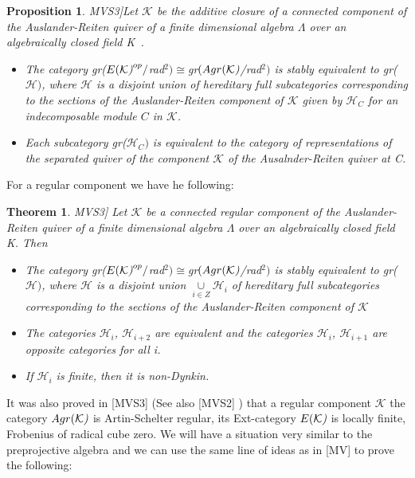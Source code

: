 \documentclass{amsart}
\newtheorem{theorem}{Theorem}
\theoremstyle{plain}
\newtheorem{proposition}{Proposition}
\numberwithin{equation}{section}
\begin{document}
\begin{proposition}
\lbrack MVS3]Let $\mathcal{K}$ be the additive closure of a connected
component of the Auslander-Reiten quiver of a finite dimensional algebra $\Lambda $ over an algebraically closed field \textrm{K}\textsl{\ }.

\begin{itemize}
\item[(a)] The category gr($E(\mathcal{K}\emph{)}^{op}/$rad$^{2})\cong $gr$(Agr(\mathcal{K}\emph{)}$/rad$^{2})$ is stably equivalent to gr($\mathcal{H}) $, where $\mathcal{H}$ is a disjoint union of hereditary full
subcategories corresponding to the sections of the Auslander-Reiten
component of $\mathcal{K}$ given by $\mathcal{H}_{C}$ for an indecomposable
module $C$ in $\mathcal{K}$.

\item[(b)] Each subcategory gr($\mathcal{H}_{C})$ is equivalent to the
category of representations of the separated quiver of the component $\mathcal{K}$ of the Ausalnder-Reiten quiver at C.
\end{itemize}
\end{proposition}

For a regular component we have he following:

\begin{theorem}
\lbrack MVS3] Let $\mathcal{K}$ be a connected regular component of the
Auslander-Reiten quiver of a finite dimensional algebra $\Lambda $ over an
algebraically closed field \textrm{K}. Then

\begin{itemize}
\item[(a)] The category gr($E(\mathcal{K}\emph{)}^{op}/$rad$^{2})\cong $gr$(Agr(\mathcal{K}\emph{)}$/rad$^{2})$ is stably equivalent to gr($\mathcal{H}) $, where $\mathcal{H}$ is a disjoint union $\underset{i\in Z}{\cup }\mathcal{H}_{i}$ of hereditary full subcategories corresponding to the
sections of the Auslander-Reiten component of $\mathcal{K}$

\item[(b)] The categories $\mathcal{H}_{i}$, $\mathcal{H}_{i+2}$ are
equivalent and the categories $\mathcal{H}_{i}$, $\mathcal{H}_{i+1}$ are
opposite categories for all i.

\item[(c)] If $\mathcal{H}_{i}$ is finite, then it is non-Dynkin.
\end{itemize}
\end{theorem}

It was also proved in [MVS3] (See also [MVS2] ) that a regular component $\mathcal{K}$ the category $Agr(\mathcal{K}\emph{)}$ is Artin-Schelter
regular, its Ext-category $E(\mathcal{K}\emph{)}$ is locally finite,
Frobenius of radical cube zero. We will have a situation very similar to the
preprojective algebra and we can use the same line of ideas as in [MV] to
prove the following:
\end{document}
